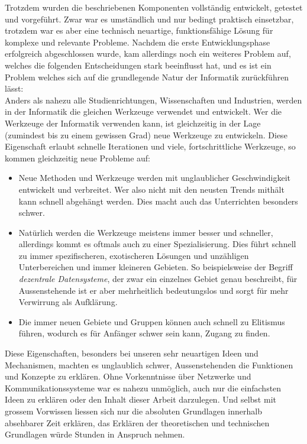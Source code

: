 \documentclass[11pt]{article}
\begin{document}
\noindent Trotzdem wurden die beschriebenen Komponenten vollständig
entwickelt, getestet und vorgeführt. Zwar war es umständlich und nur
bedingt praktisch einsetzbar, trotzdem war es aber eine technisch
neuartige, funktionsfähige Lösung für komplexe und relevante Probleme.
Nachdem die erste Entwicklungsphase erfolgreich abgeschlossen wurde,
kam allerdings noch ein weiteres Problem auf, welches die folgenden
Entscheidungen stark beeinflusst hat, und es ist ein Problem welches
sich auf die grundlegende Natur der Informatik zurückführen lässt:\\
Anders als nahezu alle Studienrichtungen, Wissenschaften und
Industrien, werden in der Informatik die gleichen Werkzeuge verwendet
und entwickelt. Wer die Werkzeuge der Informatik verwenden kann, ist
gleichzeitig in der Lage (zumindest bis zu einem gewissen Grad) neue
Werkzeuge zu entwickeln. Diese Eigenschaft erlaubt schnelle
Iterationen und viele, fortschrittliche Werkzeuge, so kommen
gleichzeitig neue Probleme auf:
\begin{itemize}
\item Neue Methoden und Werkzeuge werden mit unglaublicher Geschwindigkeit
entwickelt und verbreitet. Wer also nicht mit den neusten Trends
mithält kann schnell abgehängt werden. Dies macht auch das
Unterrichten besonders schwer.
\item Natürlich werden die Werkzeuge meistens immer besser und schneller,
allerdings kommt es oftmals auch zu einer Spezialisierung. Dies
führt schnell zu immer spezifischeren, exotischeren Lösungen und
unzähligen Unterbereichen und immer kleineren Gebieten. So
beispielsweise der Begriff \emph{dezentrale Datensysteme}, der zwar ein
einzelnes Gebiet genau beschreibt, für Aussenstehende ist er aber
mehrheitlich bedeutungslos und sorgt für mehr Verwirrung als
Aufklärung.
\item Die immer neuen Gebiete und Gruppen können auch schnell zu Elitismus
führen, wodurch es für Anfänger schwer sein kann, Zugang zu finden.
\end{itemize}

\noindent Diese Eigenschaften, besonders bei unseren sehr neuartigen
Ideen und Mechanismen, machten es unglaublich schwer, Aussenstehenden
die Funktionen und Konzepte zu erklären. Ohne Vorkenntnisse über
Netzwerke und Kommunikationssysteme war es nahezu unmöglich, auch nur
die einfachsten Ideen zu erklären oder den Inhalt dieser Arbeit
darzulegen. Und selbst mit grossem Vorwissen liessen sich nur die
absoluten Grundlagen innerhalb absehbarer Zeit erklären, das Erklären
der theoretischen und technischen Grundlagen würde Stunden in Anspruch
nehmen.\\
\end{document}
